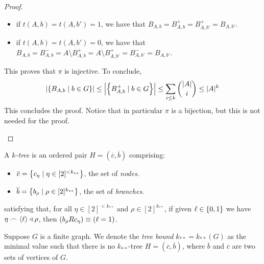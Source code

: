 \begin{corollary}[Claim 2.6.1]
\begin{proof}
\begin{enumerate}
\begin{itemize}
                    \item if $t(A,b) = t(A,b') = 1$, we have that $B_{A,b} = B^+_{A,b} = B^+_{A,b'} = B_{A,b'}$.
                    \item if $t(A,b) = t(A,b') = 0$, we have that
                    $B_{A,b} = B^-_{A,b} = A \setminus B^+_{A,b} = A \setminus B^+_{A,b'} = B^-_{A,b'} = B_{A,b'}$.
                \end{itemize}
                This proves that $\pi$ is injective.
                To conclude,
                \[
                    \left| \left\{ B_{A,b} \mid b \in G \right\} \right| \leq
                    \left| \left\{ B^+_{A,b} \mid b \in G \right\} \right| \leq
                    \sum_{i \leq k} \binom{|A|}{i} \leq |A|^k
                \]
                This concludes the proof.
                Notice that in particular $\pi$ is a bijection, but this is not needed for the proof.
        \end{enumerate}
        \end{proof}
    \end{corollary}


    \begin{definition} \label{k-tree}
        A \emph{$k$-tree} is an ordered pair $H = (\overline{c},\overline{b})$ comprising:
        \begin{itemize}
            \item $\overline{c} = \left\{  c_\eta \mid \eta \in [2]^{<k_{**}}  \right\}$, the set of \emph{nodes}.
            \item $\overline{b} = \left\{  b_\rho \mid \rho \in [2]^{k_{**}}  \right\}$, the set of \emph{branches}.
        \end{itemize}
        satisfying that, for all $\eta \in [2]^{<k_{**}}$ and $\rho \in [2]^{k_{**}}$,
        if given $\ell \in \left\{ 0, 1 \right\}$ we have $\eta \frown \left< \ell \right> \triangleleft \rho$, then
        $\left( b_\rho R c_\eta \right) \equiv \left( \ell = 1 \right)$.
    \end{definition}


    \begin{definition}[Definition 2.11] \label{tree_bound}
        Suppose $G$ is a finite graph.
        We denote the \emph{tree bound} $k_{**} = k_{**}(G)$ as the minimal value such that there is no $k_{**}$-tree
        $H = (\overline{c},\overline{b})$, where $\overline{b}$ and $\overline{c}$ are two sets of vertices of $G$.
    \end{definition}

